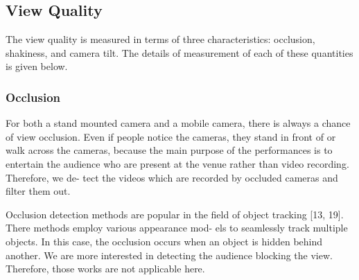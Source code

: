 \documentclass{sig-alternate-05-2015}
\begin{document}
\subsection{View Quality}
The view quality is measured in terms of three characteristics:
occlusion, shakiness, and camera tilt. The details of measurement
of each of these quantities is given below.
\subsubsection{Occlusion}
For both a stand mounted camera and a mobile camera, there
is always a chance of view occlusion. Even if people notice the cameras,
they stand in front of or walk across the cameras, because the main
purpose of the performances is to entertain the audience who are
present at the venue rather than video recording. Therefore, we de-
tect the videos which are recorded by occluded cameras and filter
them out.

Occlusion detection methods are popular in the field of object
tracking [13, 19]. There methods employ various appearance mod-
els to seamlessly track multiple objects. In this case, the occlusion
occurs when an object is hidden behind another. We are more interested in
detecting the audience blocking the view. Therefore, those works
are not applicable here.
\end{document}
